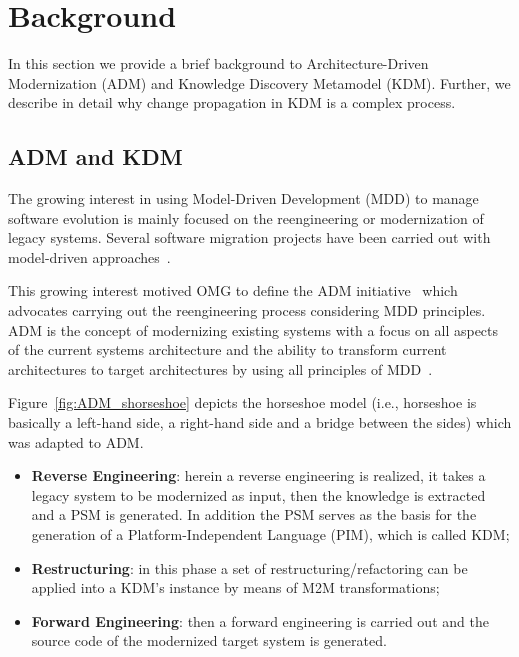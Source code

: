 
\section{Background} %
\label{sec:background}

In this section we provide a brief background to Architecture-Driven Modernization (ADM) and Knowledge Discovery Metamodel (KDM). Further, we describe in detail why change propagation in KDM is a complex process.

\subsection{ADM and KDM}

The growing interest in using Model-Driven Development (MDD) to manage software evolution is mainly focused on the reengineering or modernization of legacy systems. Several software migration projects have been carried out with model-driven approaches~\cite{Heckel2008, Andrade:2005, Reus:2006}. %

This growing interest motived OMG to define the ADM initiative~\cite{1686216} which advocates carrying out the reengineering process considering MDD principles. 
ADM is the concept of modernizing existing systems with a focus on all aspects of the current systems architecture and the ability to transform current architectures to target architectures by using all principles of MDD~\cite[p.~60]{Ulrich:2010:IST:1841736}. 


Figure~\ref{fig:ADM_shorseshoe} depicts the horseshoe model (i.e., horseshoe is basically a left-hand
side, a right-hand side and a bridge between the sides) which was adapted to ADM. %

\begin{itemize}

\item \textbf{Reverse Engineering}: herein a reverse engineering is realized, it takes a legacy system to be modernized as input, then the knowledge is extracted and a PSM is generated. In addition the PSM serves as the basis for the generation of a Platform-Independent Language (PIM), which is called KDM;

\item \textbf{Restructuring}: in this phase a set of restructuring/refactoring can be applied into a KDM's instance by means of M2M transformations;

\item \textbf{Forward Engineering}: then a forward engineering is carried out and the source code of the modernized target system is generated.

\end{itemize} 

